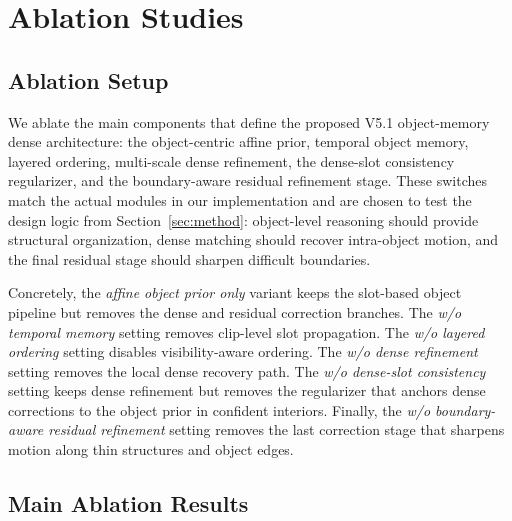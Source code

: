 \section{Ablation Studies}
\label{sec:ablation}

\subsection{Ablation Setup}

We ablate the main components that define the proposed V5.1 object-memory dense architecture: the object-centric affine prior, temporal object memory, layered ordering, multi-scale dense refinement, the dense-slot consistency regularizer, and the boundary-aware residual refinement stage. These switches match the actual modules in our implementation and are chosen to test the design logic from Section~\ref{sec:method}: object-level reasoning should provide structural organization, dense matching should recover intra-object motion, and the final residual stage should sharpen difficult boundaries.

Concretely, the \emph{affine object prior only} variant keeps the slot-based object pipeline but removes the dense and residual correction branches. The \emph{w/o temporal memory} setting removes clip-level slot propagation. The \emph{w/o layered ordering} setting disables visibility-aware ordering. The \emph{w/o dense refinement} setting removes the local dense recovery path. The \emph{w/o dense-slot consistency} setting keeps dense refinement but removes the regularizer that anchors dense corrections to the object prior in confident interiors. Finally, the \emph{w/o boundary-aware residual refinement} setting removes the last correction stage that sharpens motion along thin structures and object edges.

\subsection{Main Ablation Results}

